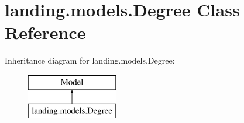 \hypertarget{classlanding_1_1models_1_1Degree}{}\section{landing.\+models.\+Degree Class Reference}
\label{classlanding_1_1models_1_1Degree}
Inheritance diagram for landing.\+models.\+Degree\+:\begin{figure}[H]
\begin{center}
\leavevmode
\includegraphics[height=2.000000cm]{classlanding_1_1models_1_1Degree}
\end{center}
\end{figure}
